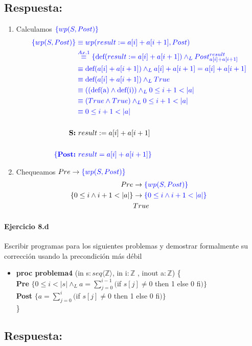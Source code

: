 \documentclass[a4paper]{article}
\begin{document}
\subsection*{Respuesta:}

\begin{enumerate}

\item Calculamos $\color{blue}\{wp(S,Post)\}$
		\begin{align*}
		\color{blue}\{wp(S,Post)\}
			&\color{blue} \equiv wp(result := a[i] + a[i + 1],Post) \\
			&\color{blue} \stackrel{Ax.1}{\equiv}
			\{\textrm{def}(result := a[i] + a[i + 1])\wedge_L Post_{a[i]+a[i+1]}^{result} \\
			&\color{blue} \equiv \textrm{def}(a[i] + a[i + 1])
				\wedge_L a[i] + a[i + 1]=a[i] + a[i + 1] \\
			&\color{blue} \equiv \textrm{def}(a[i] + a[i + 1])
				\wedge_L True \\
			&\color{blue} \equiv ((\textrm{def(a)}\wedge
				 \textrm{def(i)})\wedge_L 0\leq i+1<|a| \\
			&\color{blue} \equiv (True \wedge
				 True)\wedge_L 0\leq i+1<|a| \\
			&\color{blue} \equiv 0\leq i+1<|a| \\
			\\	  
		\textbf{S:} &\  result := a[i] + a[i + 1]\\
		\\
		\color{blue}\{\textbf{Post:} &\color{blue}\  result = a[i] + a[i + 1]\}\\
		\end{align*}
\item Chequeamos $Pre \rightarrow \color{blue}\{wp(S,Post)\}$		
		\begin{align*}
		Pre &\rightarrow \color{blue}\{wp(S,Post)\}\\
		\{0 \leq i \wedge i + 1 < |a|\}&\rightarrow \color{blue}\{0\leq i \wedge i+1<|a|\}\\
		& True 
		\end{align*}
\end{enumerate}
\paragraph{Ejercicio 8.d} Escribir programas para los siguientes problemas y demostrar 
formalmente su corrección usando la precondición más débil

\begin{itemize}
\item \textbf{proc problema4 }(in s$: seq\langle \mathbb{Z}\rangle$, in i$:\mathbb{Z}$
	, inout a$: \mathbb{Z}$) \{\smallskip \\                            
    \hspace*{6mm} \textbf{Pre }$\{0 \leq i < |s| \wedge_L a=\sum_{j=0}^{i-1}($if $s[j] \neq 0$ 
    then 1 else 0 fi$)\}$\smallskip \\          
   \hspace*{6mm} \textbf{Post }$\{a=\sum_{j=0}^{i}($if $s[j] \neq 0$ 
    then 1 else 0 fi$)\}$\\
   \}     
\end{itemize}

\subsection*{Respuesta:}
\end{document}

